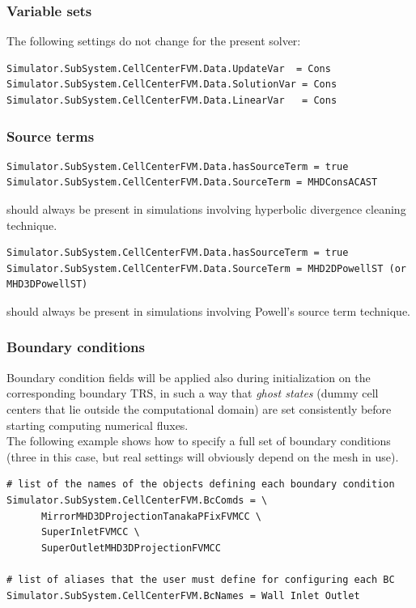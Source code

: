 \documentclass[11pt]{article}
\begin{document}
\subsubsection{Variable sets}

The following settings do not change for the present solver:

\begin{lstlisting}[breaklines]
Simulator.SubSystem.CellCenterFVM.Data.UpdateVar  = Cons
Simulator.SubSystem.CellCenterFVM.Data.SolutionVar = Cons
Simulator.SubSystem.CellCenterFVM.Data.LinearVar   = Cons
\end{lstlisting}

\subsubsection{Source terms}

\begin{lstlisting}[breaklines]
Simulator.SubSystem.CellCenterFVM.Data.hasSourceTerm = true
Simulator.SubSystem.CellCenterFVM.Data.SourceTerm = MHDConsACAST
\end{lstlisting}
should always be present in simulations involving hyperbolic divergence cleaning technique. 

\begin{lstlisting}[breaklines]
Simulator.SubSystem.CellCenterFVM.Data.hasSourceTerm = true
Simulator.SubSystem.CellCenterFVM.Data.SourceTerm = MHD2DPowellST (or MHD3DPowellST) 
\end{lstlisting}
should always be present in simulations involving Powell's source term technique.

\subsubsection{Boundary conditions}

Boundary condition fields will be applied also during initialization on the corresponding boundary TRS,
in such a way that {\it ghost states} (dummy cell centers that lie outside the computational domain) are set 
consistently before starting computing numerical fluxes. \\
The following example shows how to specify a full set of boundary conditions (three in this case, but 
real settings will obviously depend on the mesh in use).

\begin{lstlisting}[breaklines]
# list of the names of the objects defining each boundary condition
Simulator.SubSystem.CellCenterFVM.BcComds = \
      MirrorMHD3DProjectionTanakaPFixFVMCC \
      SuperInletFVMCC \
      SuperOutletMHD3DProjectionFVMCC

# list of aliases that the user must define for configuring each BC
Simulator.SubSystem.CellCenterFVM.BcNames = Wall Inlet Outlet
\end{lstlisting}
\end{document}
